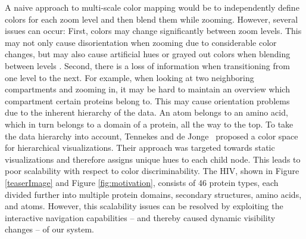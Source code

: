 \documentclass{egpubl}
\begin{document}
	A naive approach to multi-scale color mapping would be to independently define colors for each zoom level and then blend them while zooming. 
	However, several issues can occur:
	First, colors may change significantly between zoom levels.
	This may not only cause disorientation when zooming due to considerable color changes, but may also cause artificial hues or grayed out colors when blending between levels \cite{chuang2009hue}.  
	Second, there is a loss of information when transitioning from one level to the next. 
	For example, when looking at two neighboring compartments and zooming in, it may be hard to maintain an overview which compartment certain proteins belong to. 
	This may cause orientation problems due to the inherent hierarchy of the data.
	An atom belongs to an amino acid, which in turn belongs to a domain of a protein, all the way to the top.
	To take the data hierarchy into account, Tennekes and de Jonge~\cite{tennekes2014tree} proposed a color space for hierarchical visualizations. 
	Their approach was targeted towards static visualizations and therefore assigns unique hues to each child node. 
	This leads to poor scalability with respect to color discriminability. 
	The HIV, shown in Figure \ref{teaserImage} and Figure \ref{fig:motivation}, consists of 46 protein types, each divided further into multiple protein domains, secondary structures, amino acids, and atoms. 
	However, this scalability issues can be resolved by exploiting the interactive navigation capabilities -- and thereby caused dynamic visibility changes -- of our system. 
	
	
	
\end{document}
